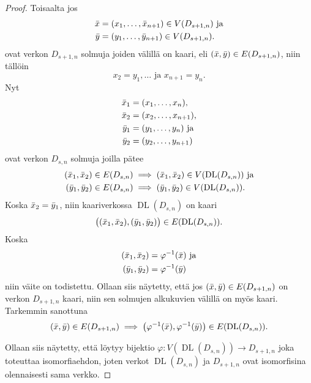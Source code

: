 \documentclass[finnish]{tktltiki2}
\theoremstyle{definition}
\theoremstyle{remark}
\newcommand{\from}{\colon}
\DeclareMathOperator{\DL}{DL}
\newcommand{\Dsn}{D_{s,n}}
\newcommand{\Dssn}{D_{s+1,n}}
\begin{document}
\begin{proof}
    Toisaalta jos
    \begin{align*}
        \x &= (x_1, \dots, \x_{n+1}) \in V(\Dssn) \text{ ja} \\
        \y &= (y_1, \dots, \y_{n+1}) \in V(\Dssn).
    \end{align*}
    ovat verkon $\Dssn$ solmuja joiden välillä on kaari, eli $(\x, \y) \in
    E(\Dssn)$, niin tällöin
    \begin{equation*}
        x_2 = y_1, \dots \text{ ja } x_{n+1} = y_n.
    \end{equation*}
    Nyt
    \begin{align*}
        \bar{x}_1 &= (x_1, \dots, x_n), \\
        \bar{x}_2 &= (x_2, \dots, x_{n+1}), \\
        \bar{y}_1 &= (y_1, \dots, y_n) \text{ ja } \\
        \bar{y}_2 &= (y_2, \dots, y_{n+1}) \\
    \end{align*}
    ovat verkon $\Dsn$ solmuja joilla pätee
    \begin{align*}
        (\x_1, \x_2) \in E(\Dsn) &\implies (\x_1, \x_2) \in V(\DL(\Dsn)) \text{ ja} \\
        (\y_1, \y_2) \in E(\Dsn) &\implies (\y_1, \y_2) \in V(\DL(\Dsn)).
    \end{align*}
    Koska $\bar{x}_2 = \bar{y}_1$, niin kaariverkossa $\DL(\Dsn)$ on kaari
    \begin{equation*}
        \big((\x_1, \x_2), (\y_1, \y_2)\big) \in E(\DL(\Dsn)).
    \end{equation*}
    Koska
    \begin{align*}
        (\bar{x}_1, \bar{x}_2) &= \varphi^{-1}(\bar{x}) \text{ ja} \\
        (\bar{y}_1, \bar{y}_2) &= \varphi^{-1}(\bar{y})
    \end{align*}
    niin väite on todistettu. Ollaan siis näytetty, että jos $(\x, \y) \in
    E(\Dssn)$ on verkon $\Dssn$ kaari, niin sen solmujen alkukuvien välillä on
    myös kaari. Tarkemmin sanottuna
    \begin{equation*}
        (\x, \y) \in E(\Dssn) \implies \big(
                                           \varphi^{-1}(\x), \varphi^{-1}(\y)
                                       \big) \in E(\DL(\Dsn)).
    \end{equation*}

    Ollaan siis näytetty, että löytyy bijektio $\varphi \from V(\DL(\Dsn)) \to
    \Dssn$ joka toteuttaa isomorfiaehdon, joten verkot $\DL(\Dsn)$ ja $\Dssn$
    ovat isomorfisina olennaisesti sama verkko.
\end{proof}
\end{document}
